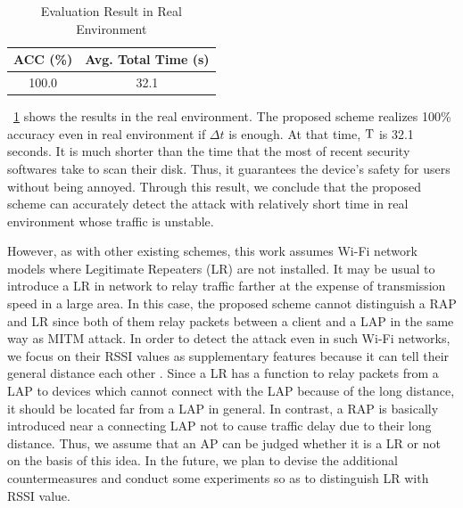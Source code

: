 \documentclass[conference]{IEEEtran}
\begin{document}
\begin{table}[t] 
    \begin{center}
        \caption{Evaluation Result in Real Environment}
        \label{tab:real}
        \begin{tabular}{c c} \hline
            ACC (\%) & Avg. Total Time (s) \\ \hline \hline
            100.0 & 32.1 \\ \hline
        \end{tabular}
    \end{center}
    \vspace{-2zh}
\end{table}

\tablename~\ref{tab:real} shows the results in the real environment.
The proposed scheme realizes 100\% accuracy even in real environment if $\Delta t$ is enough.
At that time, $\rm T$ is 32.1 seconds.
It is much shorter than the time that the most of recent security softwares take to scan their disk.
Thus, it guarantees the device's safety for users without being annoyed.
Through this result, we conclude that the proposed scheme can accurately detect the attack with relatively short time in real environment whose traffic is unstable.

However, as with other existing schemes, this work assumes Wi-Fi network models where Legitimate Repeaters (LR) are not installed.
It may be usual to introduce a LR in network to relay traffic farther at the expense of transmission speed in a large area.
In this case, the proposed scheme cannot distinguish a RAP and LR since both of them relay packets between a client and a LAP in the same way as MITM attack.
In order to detect the attack even in such Wi-Fi networks, we focus on their RSSI values as supplementary features because it can tell their general distance each other \cite{rssi}.
Since a LR has a function to relay packets from a LAP to devices which cannot connect with the LAP because of the long distance, it should be located far from a LAP in general.
In contrast, a RAP is basically introduced near a connecting LAP not to cause traffic delay due to their long distance.
Thus, we assume that an AP can be judged whether it is a LR or not on the basis of this idea.
In the future, we plan to devise the additional countermeasures and conduct some experiments so as to distinguish LR with RSSI value.
\end{document}
